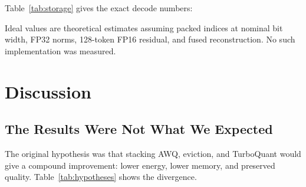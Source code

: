 \documentclass[sigconf,nonacm]{acmart}
\begin{document}
Table~\ref{tab:storage} gives the exact decode numbers:

\begin{table}[htbp]
\caption{Decode Storage at 4096 Tokens: Measured vs.\ Ideal (MiB)}
\label{tab:storage}
\centering\small
{}
\begin{minipage}{\columnwidth}\vspace{2pt}\footnotesize
Ideal values are theoretical estimates assuming packed indices at nominal bit
width, FP32 norms, 128-token FP16 residual, and fused reconstruction. No such
implementation was measured.
\end{minipage}
\end{table}


\section{Discussion}

\subsection{The Results Were Not What We Expected}

The original hypothesis was that stacking AWQ, eviction, and TurboQuant would
give a compound improvement: lower energy, lower memory, and preserved quality.
Table~\ref{tab:hypotheses} shows the divergence.

\begin{table}[htbp]
\caption{Original Hypotheses vs.\ Actual Findings}
\label{tab:hypotheses}
\centering\small
{}
\end{table}
\end{document}
